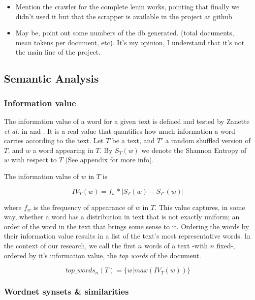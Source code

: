 \documentclass{pnastwo}
\begin{document}
\begin{article}
\begin{itemize}
  \item Mention the crawler for the complete lenin works, pointing that finally we didn't used it but that the scrapper is available in the project at github
  \item May be, point out some numbers of the db generated. (total documents, mean tokens per document, etc). It's my opinion, I understand that it's not the main line of the project.
\end{itemize}


\subsection{Semantic Analysis}
\medskip
\subsubsection{Information value}

The information value of a word for a given text is defined and tested by Zanette \textit{et al.} in \cite{DARWIN} and \cite{ENTROPIC}.
It is a real value that quantifies how much information a word carries according to the text. Let $T$ be a 
text, and $T'$ a random shuffled version of $T$, and $w$ a word appearing in $T$. 
By $S_T(w)$ we denote the Shannon Entropy of $w$ with respect to $T$ (See appendix for more info). 

The information value of $w$ in $T$ is 

\begin{equation}
  IV_T(w) = f_w* | S_T(w) - S_{T'}(w) | 
\end{equation}

where $f_w$ is the frequency of appearance of $w$ in $T$. This value captures, in some way, whether a word
has a distribution in text that is not exactly uniform; an order of the word in the text that brings some sense to it. 
Ordering the words by their information value results in a list of the text's most representative words. In the context of our research, we call the first $n$ words of a text -with $n$ fixed-, ordered by it's information value, the \textit{top words} of the document.

\begin{equation}
  top\_words_{n}(T) = \{w | max(IV_T(w))\}
\end{equation}


\subsubsection{Wordnet synsets \& similarities}


\end{article}
\end{document}
